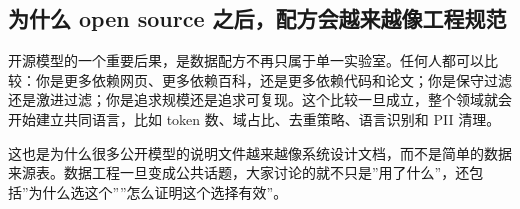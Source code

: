 \subsection{为什么 open source 之后，配方会越来越像工程规范}

开源模型的一个重要后果，是数据配方不再只属于单一实验室。任何人都可以比较：你是更多依赖网页、更多依赖百科，还是更多依赖代码和论文；你是保守过滤还是激进过滤；你是追求规模还是追求可复现。这个比较一旦成立，整个领域就会开始建立共同语言，比如 token 数、域占比、去重策略、语言识别和 PII 清理。

这也是为什么很多公开模型的说明文件越来越像系统设计文档，而不是简单的数据来源表。数据工程一旦变成公共话题，大家讨论的就不只是”用了什么”，还包括”为什么选这个””怎么证明这个选择有效”。

